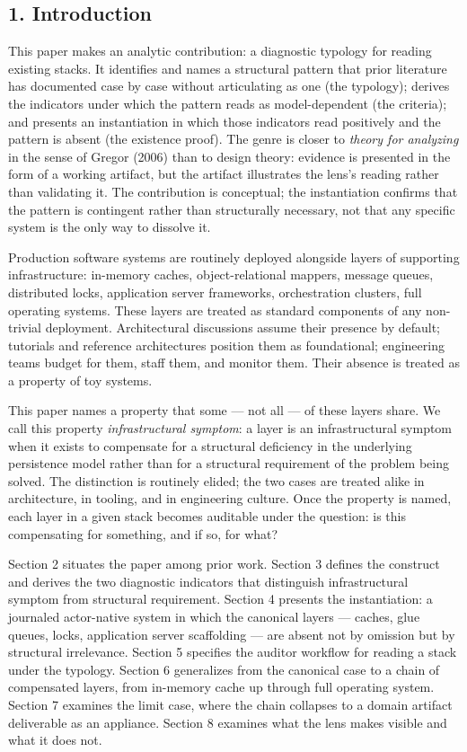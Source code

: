 \documentclass[
]{article}
\begin{document}
\subsection{1. Introduction}\label{introduction}

This paper makes an analytic contribution: a diagnostic typology for
reading existing stacks. It identifies and names a structural pattern
that prior literature has documented case by case without articulating
as one (the typology); derives the indicators under which the pattern
reads as model-dependent (the criteria); and presents an instantiation
in which those indicators read positively and the pattern is absent (the
existence proof). The genre is closer to \emph{theory for analyzing} in
the sense of Gregor (2006) than to design theory: evidence is presented
in the form of a working artifact, but the artifact illustrates the
lens's reading rather than validating it. The contribution is
conceptual; the instantiation confirms that the pattern is contingent
rather than structurally necessary, not that any specific system is the
only way to dissolve it.

Production software systems are routinely deployed alongside layers of
supporting infrastructure: in-memory caches, object-relational mappers,
message queues, distributed locks, application server frameworks,
orchestration clusters, full operating systems. These layers are treated
as standard components of any non-trivial deployment. Architectural
discussions assume their presence by default; tutorials and reference
architectures position them as foundational; engineering teams budget
for them, staff them, and monitor them. Their absence is treated as a
property of toy systems.

This paper names a property that some --- not all --- of these layers
share. We call this property \emph{infrastructural symptom}: a layer is
an infrastructural symptom when it exists to compensate for a structural
deficiency in the underlying persistence model rather than for a
structural requirement of the problem being solved. The distinction is
routinely elided; the two cases are treated alike in architecture, in
tooling, and in engineering culture. Once the property is named, each
layer in a given stack becomes auditable under the question: is this
compensating for something, and if so, for what?

Section 2 situates the paper among prior work. Section 3 defines the
construct and derives the two diagnostic indicators that distinguish
infrastructural symptom from structural requirement. Section 4 presents
the instantiation: a journaled actor-native system in which the
canonical layers --- caches, glue queues, locks, application server
scaffolding --- are absent not by omission but by structural
irrelevance. Section 5 specifies the auditor workflow for reading a
stack under the typology. Section 6 generalizes from the canonical case
to a chain of compensated layers, from in-memory cache up through full
operating system. Section 7 examines the limit case, where the chain
collapses to a domain artifact deliverable as an appliance. Section 8
examines what the lens makes visible and what it does not.
\end{document}
